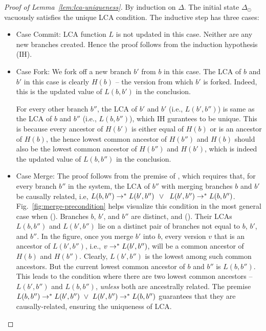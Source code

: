 \begin{proof}[Proof of Lemma~\ref{lem:lca-uniqueness}]

  By induction on $\Delta$. The initial state $\Delta_{\odot}$
  vacuously satisfies the unique LCA condition. The inductive step has
  three cases:
  \begin{itemize}
    \item Case {\sc Commit}: LCA function $L$ is not updated in this
      case. Neither are any new branches created. Hence the proof
      follows from the induction hypothesis (IH).

    \item Case {\sc Fork}: We fork off a new branch $b'$ from $b$ in
      this case. The LCA of $b$ and $b'$ in this case is clearly
      $H(b)$ -- the version from which $b'$ is forked. Indeed, this is
      the updated value of $L(b,b')$ in the conclusion.  
      
      For every other branch $b''$, the LCA of $b'$ and $b'$ (i.e.,
      $L(b',b'')$) is same as the LCA of $b$ and $b''$ (i.e.,
      $L(b,b'')$), which IH gurantees to be unique. This is because
      every ancestor of $H(b')$ is either equal of $H(b)$ or is an
      ancestor of $H(b)$, the hence lowest common ancestor of $H(b'')$
      and $H(b)$ should also be the lowest common ancestor of $H(b'')$
      and $H(b')$, which is indeed the updated value of $L(b,b'')$ in
      the conclusion.

    \item Case {\sc Merge}: The proof follows from the premise
    of , which requires that, for every branch $b''$ in
    the system, the LCA of $b''$ with merging branches $b$ and $b'$ be
    causally related, i.e, $L(b,b'') \rightarrow^{*} L(b',b'') ~~\vee~$
    $L(b',b'') \rightarrow^{*} L(b,b'')$. Fig.~\ref{fig:merge-precondition}
    helps visualize this condition in the most general case when
    (). Branches $b$, $b'$, and $b''$ are distinct, and
    (). Their LCAs $L(b,b'')$ and $L(b',b'')$ lie on a distinct
    pair of branches not equal to $b$, $b'$, and $b''$. In the figure,
    once you merge $b'$ into $b$, every version $v$ that is an
    ancestor of $L(b',b'')$, i.e., $v \rightarrow^{*} L(b',b'')$, will be  a
    common ancestor of $H(b)$ and $H(b'')$. Clearly, $L(b',b'')$ is
    the lowest among such common ancestors. But the current lowest
    common ancestor of $b$ and $b''$ is $L(b,b'')$. This leads to
    the condition where there are two lowest common ancestors --
    $L(b',b'')$ and $L(b,b'')$, \emph{unless} both are ancestrally
    related. The premise
    $L(b,b'') \rightarrow^{*} L(b',b'') ~\vee~ L(b',b'') \rightarrow^{*} L(b,b'')$
    guarantees that they are causally-related, ensuring the uniqueness
    of LCA.


\end{itemize}
\end{proof}
